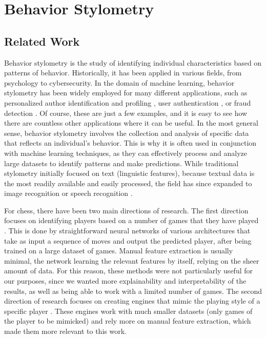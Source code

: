 \chapter{Behavior Stylometry}
\label{chapter:behavior_stylometry}

\section{Related Work}
\label{section:related_work_behavior_stylometry}
Behavior stylometry is the study of identifying individual characteristics based on patterns of behavior.
Historically, it has been applied in various fields, from psychology to cybersecurity.
In the domain of machine learning, behavior stylometry has been widely employed for many different applications, such as personalized author identification and profiling \cite{author_identification}, user authentication \cite{user_authentication}, or fraud detection \cite{fraud_detection}.
Of course, these are just a few examples, and it is easy to see how there are countless other applications where it can be useful.
In the most general sense, behavior stylometry involves the collection and analysis of specific data that reflects an individual's behavior.
This is why it is often used in conjunction with machine learning techniques, as they can effectively process and analyze large datasets to identify patterns and make predictions.
While traditional stylometry initially focused on text (linguistic features), because textual data is the most readily available and easily processed, the field has since expanded to image recognition \cite{image_recognition} or speech recognition \cite{speech_recognition}.

For chess, there have been two main directions of research.
The first direction focuses on identifying players based on a number of games that they have played \cite{chess_stylometry1}.
This is done by straightforward neural networks of various architectures that take as input a sequence of moves and output the predicted player, after being trained on a large dataset of games.
Manual feature extraction is usually minimal, the network learning the relevant features by itself, relying on the sheer amount of data.
For this reason, these methods were not particularly useful for our purposes, since we wanted more explainability and interpretability of the results, as well as being able to work with a limited number of games.
The second direction of research focuses on creating engines that mimic the playing style of a specific player \cite{chess_stylometry2}.
These engines work with much smaller datasets (only games of the player to be mimicked) and rely more on manual feature extraction, which made them more relevant to this work.

